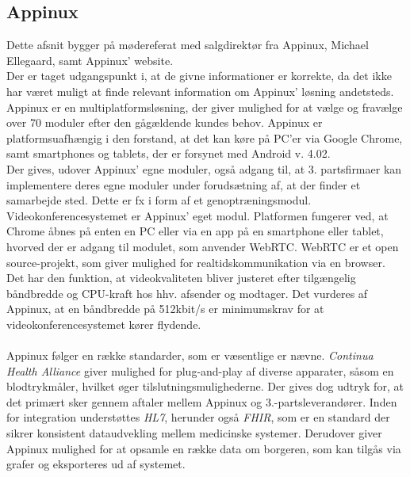 \subsection{Appinux}
Dette afsnit bygger på mødereferat med salgdirektør fra Appinux, Michael Ellegaard\cite{moedeappinux}, samt Appinux' website\cite{appinuxwebsite}.\\Der er taget udgangspunkt i, at de givne informationer er korrekte, da det ikke har været muligt at finde relevant information om Appinux' løsning andetsteds.\\
Appinux er en multiplatformsløsning, der giver mulighed for at vælge og fravælge over 70 moduler efter den gågældende kundes behov. Appinux er platformsuafhængig i den forstand, at det kan køre på PC'er via Google Chrome, samt  smartphones og tablets, der er forsynet med Android v. 4.02.\\Der gives, udover Appinux' egne moduler, også adgang til, at 3. partsfirmaer kan implementere deres egne moduler under forudsætning af, at der finder et samarbejde sted. Dette er fx i form af et genoptræningsmodul.\\Videokonferencesystemet er Appinux' eget modul. Platformen fungerer ved, at Chrome åbnes på enten en PC eller via en app på en smartphone eller tablet, hvorved der er adgang til modulet, som anvender WebRTC. WebRTC er et open source-projekt, som giver mulighed for realtidskommunikation via en browser\cite{webrtchjemmeside}. Det har den funktion, at videokvaliteten bliver justeret efter tilgængelig båndbredde og CPU-kraft hos hhv. afsender og modtager. Det vurderes af Appinux, at en båndbredde på 512kbit/s er minimumskrav for at videokonferencesystemet kører flydende.
\\ \\
Appinux følger en række standarder, som er væsentlige   er nævne. \textit{Continua Health Alliance} giver mulighed for plug-and-play af diverse apparater, såsom en blodtrykmåler, hvilket øger tilslutningsmulighederne. Der gives dog udtryk for, at det primært sker gennem aftaler mellem Appinux og 3.-partsleverandører. Inden for integration understøttes \textit{HL7}, herunder også \textit{FHIR}, som er en standard der sikrer konsistent dataudvekling mellem medicinske systemer. Derudover giver Appinux mulighed for at opsamle en række data om borgeren, som kan tilgås via grafer og eksporteres ud af systemet.

